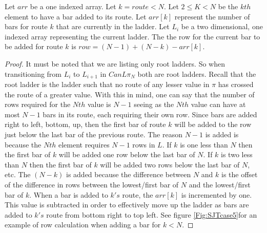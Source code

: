 \begin{lemma}
  Let $arr$ be a one indexed array. Let $k=route < N$. Let $2 \leq K < N$ be the $kth$ element to have a bar added to its route. 
  Let $arr[k]$ represent the number of bars for route $k$ that are currently in the 
  ladder. Let $L_{i}$ be a two dimensional, one indexed array representing the current ladder.
  The the row for the current bar to be added for route $k$ is $row=(N-1) + (N-k) - arr[k]$.
\end{lemma}
\begin{proof}
   It must be noted that we are listing only root ladders. So when transitioning from 
$L_{i}$ to $L_{i+1}$ in $CanL{\pi_{N}}$ both are root ladders. Recall that the root ladder is the ladder such that no  
route of any lesser value in $\pi$ has crossed the route of a greater value. With this in mind, one can say that the 
number of rows required for the $Nth$ value is $N-1$ seeing as the $Nth$ value can have at most $N-1$ bars in its route, each requiring  their own 
row. Since bars are added right to left, bottom, up, then the first bar of route $k$ will be added to the row 
just  below the last bar of the previous route. The reason $N-1$ is added is because the $Nth$ element requires 
$N-1$ rows in $L$. If $k$ is one less than $N$ then 
the first bar of $k$ will be added one row below the last bar of $N$. If $k$ is two less than $N$ then the first bar 
of $k$ will be added two rows below the last bar of $N$, etc. The $(N-k)$ is added because 
the difference between $N$ and $k$ is the offset of the difference in rows between the lowest/first bar of $N$ 
and the lowest/first bar of $k$. When a bar is added to $k's$ route, the $arr[k]$ is incremented by one. This value is subtracted in 
order to effectively move up the ladder as bars are added to $k's$ route from bottom right to top left. See figure \ref{Fig:SJTcase5}for an example of 
row calculation when adding a bar for $k < N$.
\end{proof}\pagebreak

